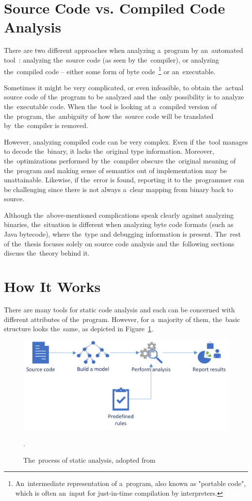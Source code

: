 \documentclass[
  digital, %
  table,   %
  lof,     %
  lot,     %
  oneside,
]{fithesis3}
\begin{document}
\section{Source Code vs. Compiled Code Analysis}
There are two different approaches when analyzing a~program by an~automated tool~\cite{secure-programming-with-sca}: analyzing the~source code (as seen by the~compiler), or analyzing the~compiled code -- either some form of byte code~\footnote{An~intermediate representation of a~program, also known as "portable code", which is often an~input for just-in-time compilation by interpreters.} or an~executable.

Sometimes it might be very complicated, or even infeasible, to obtain the~actual source code of the~program to be analyzed and the~only possibility is to analyze the~executable code. When the~tool is looking at a~compiled version of the~program, the~ambiguity of how the~source code will be translated by~the~compiler is removed.

However, analyzing compiled code can be very complex. Even if the~tool manages to decode the~binary, it lacks the~original type information. Moreover, the~optimizations performed by the~compiler obscure the~original meaning of the~program and making sense of semantics out of implementation may be unattainable. Likewise, if the~error is found, reporting it to the~programmer can be challenging since there is not always a~clear mapping from binary back to source. 

Although the~above-mentioned complications speak clearly against analyzing binaries, the~situation is different when analyzing byte code formats (such as Java bytecode), where the~type and debugging information is present. The~rest of the~thesis focuses solely on source code analysis and the~following sections discuss the~theory behind it.

\section{How It Works}
There are many tools for static code analysis and each can be concerned with different attributes of the~program. However, for a~majority of them, the~basic structure looks the~same, as depicted in Figure~\ref{fig:static-code-analysis-internals}.

\begin{figure}[h!]
		\centering
			\includegraphics[scale=0.80]{img/static-code-analysis-internals}
		\caption{The~process of static analysis, adopted from~\cite{secure-programming-with-sca}}.
		\label{fig:static-code-analysis-internals}
\end{figure}
\end{document}
